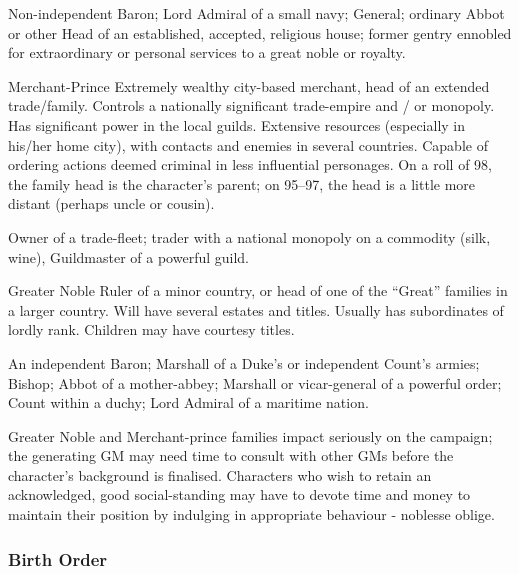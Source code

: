 \begin{multicols*}{3}
\begin{Description}
\begin{example}
Non-independent Baron; Lord Admiral of a small navy; General; ordinary
Abbot or other Head of an established, accepted, religious house;
former gentry ennobled for extraordinary or personal services to a
great noble or royalty.
\end{example}

\item[Merchant-Prince] Extremely wealthy city-based merchant, head of
an extended trade/family.  Controls a nationally significant
trade-empire and / or monopoly. Has significant power in the local
guilds. Extensive resources (especially in his/her home city), with
contacts and enemies in several countries. Capable of ordering actions
deemed criminal in less influential personages. On a roll of 98, the
family head is the character's parent; on 95--97, the head is a little
more distant (perhaps uncle or cousin).

\begin{example}
Owner of a trade-fleet; trader with a national monopoly on a
commodity (\eg silk, wine), Guildmaster of a powerful guild.
\end{example}

\item[Greater Noble] Ruler of a minor country, or head of one of the
``Great'' families in a larger country.  Will have several estates and
titles. Usually has subordinates of lordly rank. Children may have
courtesy titles.

\begin{example}
An independent Baron; Marshall of a Duke's or independent Count's
armies; Bishop; Abbot of a mother-abbey; Marshall or vicar-general of
a powerful order; Count within a duchy; Lord Admiral of a maritime
nation.
\end{example}

Greater Noble and Merchant-prince families impact seriously on the
campaign; the generating GM may need time to consult with other GMs
before the character's background is finalised.  Characters who wish
to retain an acknowledged, good social-standing may have to devote
time and money to maintain their position by indulging in appropriate
behaviour - noblesse oblige.
\end{Description}

\subsubsection{Birth Order}


\end{multicols*}
